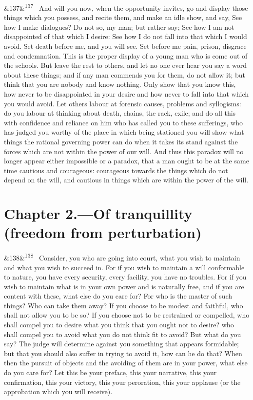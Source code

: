 \documentclass[12pt]{article}
\newcommand{\para}[1][]{\par\noindent\ifx&#1&\else\textsuperscript{\footnotesize #1}~\fi}
\begin{document}
\para[137] And will you now, when the opportunity invites, go and display those things which you possess, and recite them, and make an idle show, and say, See how I make dialogues? Do not so, my man; but rather say; See how I am not disappointed of that which I desire: See how I do not fall into that which I would avoid. Set death before me, and you will see. Set before me pain, prison, disgrace and condemnation. This is the proper display of a young man who is come out of the schools. But leave the rest to others, and let no one ever hear you say a word about these things; and if any man commends you for them, do not allow it; but think that you are nobody and know nothing. Only show that you know this, how never to be disappointed in your desire and how never to fall into that which you would avoid. Let others labour at forensic causes, problems and syllogisms: do you labour at thinking about death, chains, the rack, exile; and do all this with confidence and reliance on him who has called you to these sufferings, who has judged you worthy of the place in which being stationed you will show what things the rational governing power can do when it takes its stand against the forces which are not within the power of our will. And thus this paradox will no longer appear either impossible or a paradox, that a man ought to be at the same time cautious and courageous: courageous towards the things which do not depend on the will, and cautious in things which are within the power of the will.

\section*{Chapter 2.---Of tranquillity (freedom from perturbation)}

\para[138] Consider, you who are going into court, what you wish to maintain and what you wish to succeed in. For if you wish to maintain a will conformable to nature, you have every security, every facility, you have no troubles. For if you wish to maintain what is in your own power and is naturally free, and if you are content with these, what else do you care for? For who is the master of such things? Who can take them away? If you choose to be modest and faithful, who shall not allow you to be so? If you choose not to be restrained or compelled, who shall compel you to desire what you think that you ought not to desire? who shall compel you to avoid what you do not think fit to avoid? But what do you say? The judge will determine against you something that appears formidable; but that you should also suffer in trying to avoid it, how can he do that? When then the pursuit of objects and the avoiding of them are in your power, what else do you care for? Let this be your preface, this your narrative, this your confirmation, this your victory, this your peroration, this your applause (or the approbation which you will receive).
\end{document}
